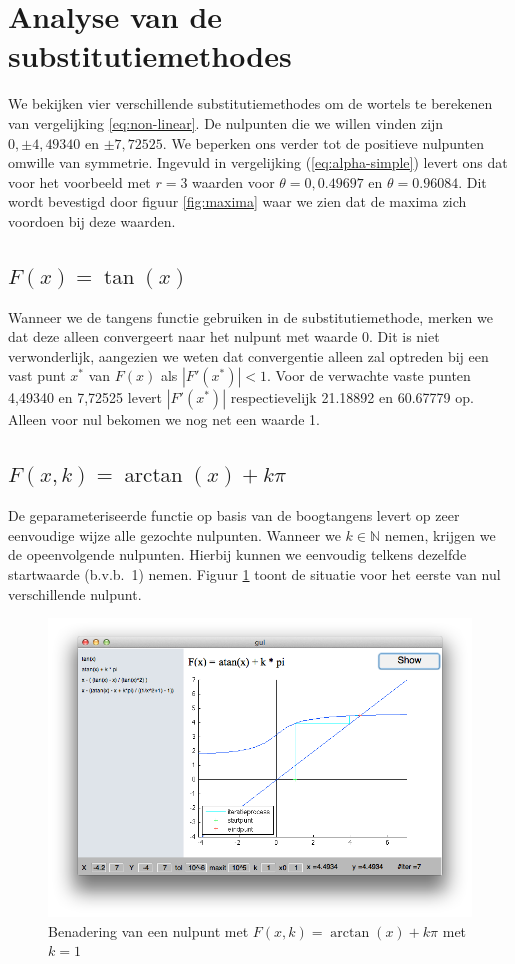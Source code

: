 \documentclass[12pt,a4paper]{article}
\begin{document}
\section{Analyse van de substitutiemethodes}

We bekijken vier verschillende substitutiemethodes om de wortels te berekenen van vergelijking \ref{eq:non-linear}. De nulpunten die we willen vinden zijn $0, \pm4,49340$ en $\pm7,72525$. We beperken ons verder tot de positieve nulpunten omwille van symmetrie. Ingevuld in vergelijking (\ref{eq:alpha-simple}) levert ons dat voor het voorbeeld met $r=3$ waarden voor $\theta = 0, 0.49697$ en $\theta = 0.96084$. Dit wordt bevestigd door figuur \ref{fig:maxima} waar we zien dat de maxima zich voordoen bij deze waarden.

\subsection{$F(x) = \tan(x)$}

Wanneer we de tangens functie gebruiken in de substitutiemethode, merken we dat deze alleen convergeert naar het nulpunt met waarde 0. Dit is niet verwonderlijk, aangezien we weten dat convergentie alleen zal optreden bij een vast punt $x^*$ van $F(x)$ als $|F'(x^*)| < 1$. Voor de verwachte vaste punten 4,49340 en 7,72525 levert $|F'(x^*)|$ respectievelijk 21.18892 en 60.67779 op. Alleen voor nul bekomen we nog net een waarde 1.

\subsection{$F(x,k) = \arctan(x) + k\pi$}

De geparameteriseerde functie op basis van de boogtangens levert op zeer eenvoudige wijze alle gezochte nulpunten. Wanneer we $k \in \mathbb{N}$ nemen, krijgen we de opeenvolgende nulpunten. Hierbij kunnen we eenvoudig telkens dezelfde startwaarde (b.v.b.\ 1) nemen. Figuur \ref{fig:arctan} toont de situatie voor het eerste van nul verschillende nulpunt.

\begin{figure}
\begin{center}
 \includegraphics[width=120mm]{resources/arctan.png}
 \caption{Benadering van een nulpunt met $F(x,k) = \arctan(x) + k\pi$ met $k=1$}
  \label{fig:arctan}
\end{center}
\end{figure}
\end{document}
